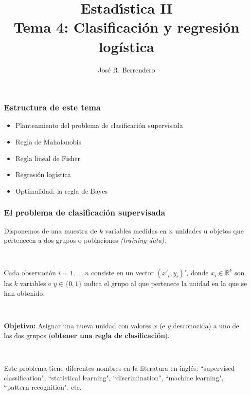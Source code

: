 \documentclass{beamer}
\title[Tema 1]{Estad\'{\i}stica II\\
Tema 4: Clasificación y regresión logística}
\author[J.R. Berrendero]
{Jos\'{e} R. Berrendero}
\date{}
\institute{Departamento de Matem\'{a}ticas\\
 Universidad Aut\'{o}noma de Madrid}
\begin{document}
\frame{\titlepage}


\begin{frame}
\frametitle{Estructura de este tema}

\begin{itemize}
\item Planteamiento del problema de clasificación supervisada

\item Regla de Mahalanobis

\item Regla lineal de Fisher

\item Regresión logística

\item Optimalidad: la regla de Bayes

\end{itemize}


\end{frame}
\begin{frame}[plain]
\frametitle{El problema de clasificación supervisada}

Disponemos de una muestra de $k$ variables medidas en $n$ unidades u objetos que pertenecen a dos grupos o poblaciones \textit{(training data)}.

\

Cada observación $i=1,\ldots,n$ consiste en un vector $(x'_i,y_i)'$, donde $x_i\in\mathbb{R}^k$ son las $k$ variables e    $y\in\{0,1\}$ indica el grupo al que pertenece la unidad en la que se han obtenido. 

\

\textbf{Objetivo:} Asignar una nueva unidad con valores $x$ (e $y$ desconocida) a uno de los dos grupos (\textbf{obtener una regla de clasificación}).


\

 Este problema tiene diferentes nombres en la literatura en inglés: ``supervised classification", ``statistical learning", ``discrimination", ``machine learning", ``pattern recognition", etc.







\end{frame}
\end{document}
